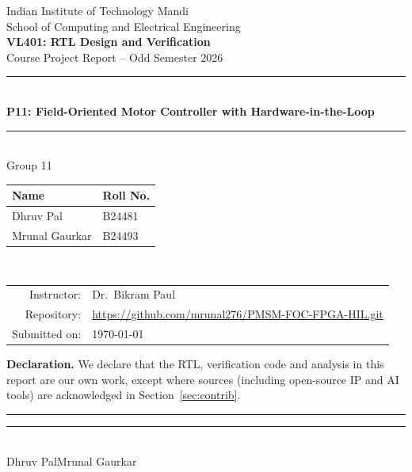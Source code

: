 \documentclass[11pt,a4paper]{article}
\newcommand{\groupno}{11}
\newcommand{\projno}{P11}
\newcommand{\projtitle}{Field-Oriented Motor Controller with Hardware-in-the-Loop}
\newcommand{\studentA}{Dhruv Pal}
\newcommand{\rollA}{B24481}
\newcommand{\studentB}{Mrunal Gaurkar}
\newcommand{\rollB}{B24493}
\newcommand{\submitdate}{\today}
\begin{document}
\begin{titlepage}
\centering
{\large Indian Institute of Technology Mandi}\\[2pt]
{\normalsize School of Computing and Electrical Engineering}\\[1.4cm]
{\Large\bfseries VL401: RTL Design and Verification}\\[4pt]
{\large Course Project Report -- Odd Semester 2026}\\[1.4cm]
{\color{iitblue}\rule{\linewidth}{1pt}}\\[8pt]
{\LARGE\bfseries \projno: \projtitle}\\[8pt]
{\color{iitblue}\rule{\linewidth}{1pt}}\\[1.2cm]
{\large Group \groupno}\\[10pt]
\begin{tabular}{ll}
\toprule
\textbf{Name} & \textbf{Roll No.}\\
\midrule
\studentA & \rollA\\
\studentB & \rollB\\
\bottomrule
\end{tabular}\\[1.0cm]
\begin{tabular}{rl}
Instructor: & Dr.\ Bikram Paul\\
Repository: & \url{https://github.com/mrunal276/PMSM-FOC-FPGA-HIL.git}\\
Submitted on: & \submitdate\\
\end{tabular}
\vfill
\begin{minipage}{0.92\linewidth}\small
\textbf{Declaration.} We declare that the RTL, verification code and analysis in this report are our own
work, except where sources (including open-source IP and AI tools) are acknowledged in
Section~\ref{sec:contrib}.\\[0.8cm]
\rule{5.5cm}{0.4pt}\hfill\rule{5.5cm}{0.4pt}\\
\studentA\hfill\studentB
\end{minipage}
\end{titlepage}
\end{document}
